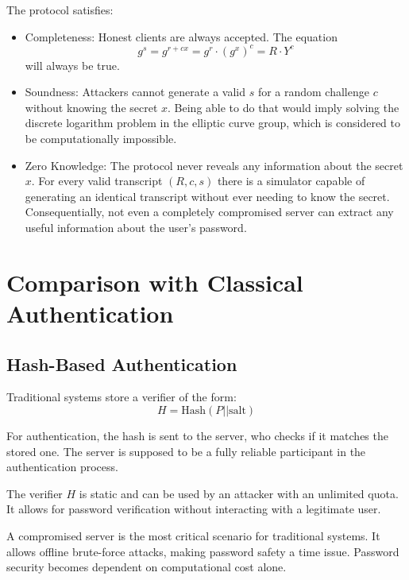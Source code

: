 \documentclass[conference]{IEEEtran}
\begin{document}
The protocol satisfies:
\begin{itemize}
    \item Completeness: Honest clients are always accepted. The equation
    \begin{equation}
        g^s = g^{r+cx} = g^r \cdot (g^x)^c = R \cdot Y^c
    \end{equation}
    will always be true.
    \item Soundness: Attackers cannot generate a valid $s$ for a random challenge $c$ without knowing the secret $x$. Being able to do that would imply solving the discrete logarithm problem in the elliptic curve group, which is considered to be computationally impossible.
    \item Zero Knowledge: The protocol never reveals any information about the secret $x$. For every valid transcript $(R, c, s)$ there is a simulator capable of generating an identical transcript without ever needing to know the secret. Consequentially, not even a completely compromised server can extract any useful information about the user's password.
\end{itemize}

\section{Comparison with Classical Authentication}
\subsection{Hash-Based Authentication}

Traditional systems store a verifier of the form:
\begin{equation}
H = \mathrm{Hash}(P || \text{salt})
\end{equation}

For authentication, the hash is sent to the server, who checks if it matches the stored one. The server is supposed to be a fully reliable participant in the authentication process.

The verifier $H$ is static and can be used by an attacker with an unlimited quota. It allows for password verification without interacting with a legitimate user.

A compromised server is the most critical scenario for traditional systems. It allows offline brute-force attacks, making password safety a time issue. Password security becomes dependent on computational cost alone.
\end{document}

